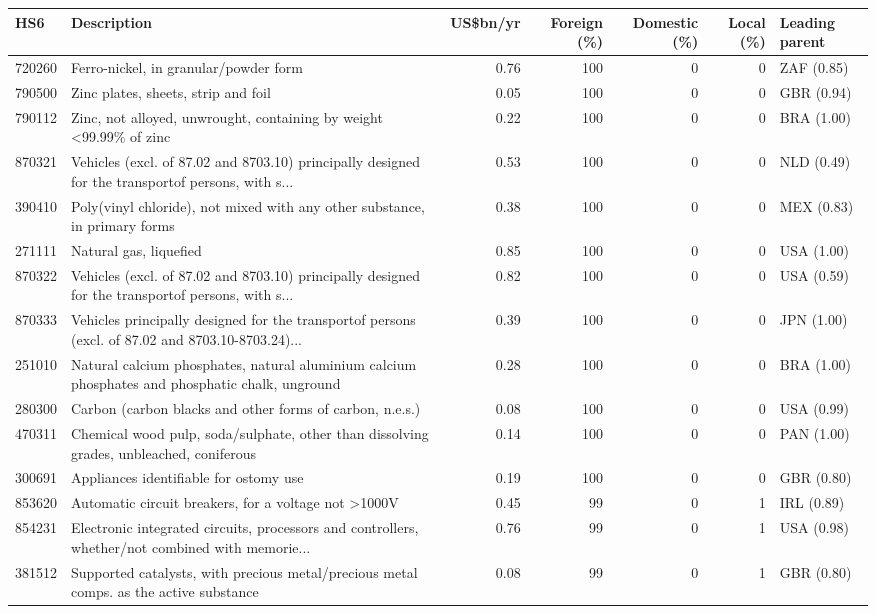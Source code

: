 \begin{tabular}{@{}l p{6.4cm} r r r r l@{}}
\toprule
HS6 & Description & US\$bn/yr & Foreign (\%) & Domestic (\%) & Local (\%) & Leading parent \\
\midrule
720260 & Ferro-nickel, in granular/\allowbreak{}powder form & 0.76 & 100 & 0 & 0 & ZAF (0.85) \\
790500 & Zinc plates, sheets, strip and foil & 0.05 & 100 & 0 & 0 & GBR (0.94) \\
790112 & Zinc, not alloyed, unwrought, containing by weight <99.99\% of zinc & 0.22 & 100 & 0 & 0 & BRA (1.00) \\
870321 & Vehicles (excl. of 87.02 and 8703.10) principally designed for the transportof persons, with s... & 0.53 & 100 & 0 & 0 & NLD (0.49) \\
390410 & Poly(vinyl chloride), not mixed with any other substance, in primary forms & 0.38 & 100 & 0 & 0 & MEX (0.83) \\
271111 & Natural gas, liquefied & 0.85 & 100 & 0 & 0 & USA (1.00) \\
870322 & Vehicles (excl. of 87.02 and 8703.10) principally designed for the transportof persons, with s... & 0.82 & 100 & 0 & 0 & USA (0.59) \\
870333 & Vehicles principally designed for the transportof persons (excl. of 87.02 and 8703.10-8703.24)... & 0.39 & 100 & 0 & 0 & JPN (1.00) \\
251010 & Natural calcium phosphates, natural aluminium calcium phosphates and phosphatic chalk, unground & 0.28 & 100 & 0 & 0 & BRA (1.00) \\
280300 & Carbon (carbon blacks and other forms of carbon, n.e.s.) & 0.08 & 100 & 0 & 0 & USA (0.99) \\
470311 & Chemical wood pulp, soda/\allowbreak{}sulphate, other than dissolving grades, unbleached, coniferous & 0.14 & 100 & 0 & 0 & PAN (1.00) \\
300691 & Appliances identifiable for ostomy use & 0.19 & 100 & 0 & 0 & GBR (0.80) \\
853620 & Automatic circuit breakers, for a voltage not >1000V & 0.45 & 99 & 0 & 1 & IRL (0.89) \\
854231 & Electronic integrated  circuits, processors and controllers, whether/\allowbreak{}not combined with memorie... & 0.76 & 99 & 0 & 1 & USA (0.98) \\
381512 & Supported catalysts, with precious metal/\allowbreak{}precious metal comps. as the active substance & 0.08 & 99 & 0 & 1 & GBR (0.80) \\

\end{tabular}
